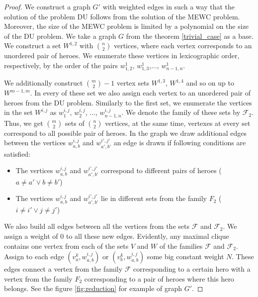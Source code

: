\documentclass[smallextended]{svjour3}       %
\begin{document}
\begin{proof}
We construct a graph $G'$ with weighted edges in such a way that the solution of the problem DU follows from the solution of the MEWC problem. Moreover, the size of the MEWC problem is limited by a polynomial on the size of the DU problem. We take a graph $G$ from the theorem \ref{trivial_case} as a base. We construct a set $ W^{1,2} $ with $ \binom{n}{2} $ vertices, where each vertex corresponds to an unordered pair of heroes. We enumerate these vertices in lexicographic order, respectively, by the order of the pairs $ w_{1,2}^1 $, $w_{1,3}^1 $,..., $w_{n-1, n}^1$. 

    We additionally construct $\binom{m}{2}-1$ vertex sets $W^{1,3} $, $W^{1,4} $ and so on up to $W^{m-1, m}$. In every of these set we also assign each vertex to an unordered pair of heroes from the DU problem. Similarly to the first set, we enumerate the vertices in the set $W^{i, j} $ as $ w_1^{i, j} $, $ w_2^{i,j} $, ..., $ w_{n-1, n }^{i, j} $.   
   We denote the family of these sets by $\mathcal{F}_2 $. Thus, we get $ \binom {m}{2} $ sets of $ \binom{n}{2}$ vertices, at the same time, vertexes at every set correspond to all possible pair of heroes.    
    In the graph we draw additional edges between the vertices $ w_{a, b}^{i, j} $ and $w_{a',b'}^{i',j'} $ an edge is drawn if following conditions are satisfied:
    \begin{itemize}
        \item The vertices $ w_{a, b}^{i, j} $ and $w_ {a', b'}^{i',j'} $ correspond to different pairs of heroes ($ a \neq a '\lor b \neq b'$)
        \item The vertices $ w_ {a,b}^{i, j} $ and $w_{a', b'} ^{i', j'} $ lie in different sets from the family $ F_2 $ ($ i \neq i '\lor j \neq j' $)
    \end{itemize}
    
    We also build all edges between all the vertices from the sets $ \mathcal {F} $ and $ \mathcal {F}_2 $. We assign a weight of 0 to all these new edges. Evidently, any maximal clique contains one vertex from each of the sets $V$ and $W$ of the families $ \mathcal {F} $ and $ \mathcal{F}_2 $. \\
    Assign to each edge  $ (v_a^k, w_{a,b}^{i, j}) $ or $ (v_b^k, w_{a,b}^{i,j}) $ some big constant weight $N$. These edges connect a vertex from the family $\mathcal{F}$ corresponding to a certain hero with a vertex from the family $ F_2 $ corresponding to a pair of heroes where this hero belongs. See the figure \ref{fig:reduction} for example of graph $G'$.
    


\end{proof}
\end{document}
